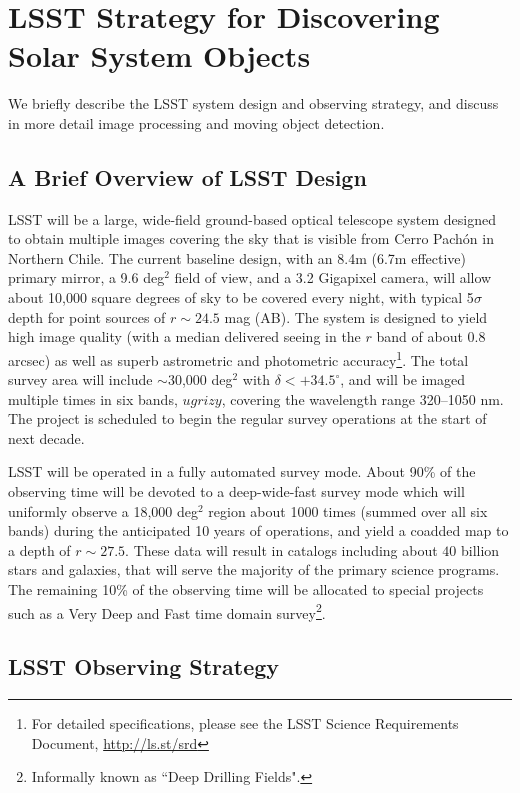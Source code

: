 \section{LSST Strategy for Discovering Solar System Objects}

We briefly describe the LSST system design and observing strategy, and discuss in more
detail image processing and moving object detection.

\subsection{A Brief Overview of LSST  Design}

LSST will be a large, wide-field ground-based optical telescope system
designed to obtain multiple images covering the sky that is visible
from Cerro Pach\'{o}n in Northern Chile. The current baseline design,
with an 8.4m (6.7m effective) primary mirror, a 9.6 deg$^2$ field of
view, and a 3.2 Gigapixel camera, will allow about 10,000 square
degrees of sky to be covered every night, with typical 5$\sigma$ depth
for point sources of $r\sim24.5$ mag (AB). The system is designed to yield
high image quality (with a median delivered seeing in the $r$ band of
about 0.8 arcsec) as well as superb astrometric  and photometric
accuracy\footnote{For detailed specifications, please see the LSST
Science Requirements Document, \url{http://ls.st/srd}}. The total survey
area will include $\sim$30,000 deg$^2$ with $\delta<+34.5^\circ$, and
will be imaged multiple times in six bands, $ugrizy$, covering the
wavelength range 320--1050 nm. The project is scheduled to  begin the
regular survey operations at the start of next decade.

LSST will be operated in a fully automated survey mode. About 90\% of the
observing time will be devoted to a deep-wide-fast survey mode which will
uniformly observe a 18,000 deg$^2$ region about 1000 times (summed over
all six bands) during the anticipated 10 years of operations, and yield a coadded map
to a depth of $r\sim27.5$. These data will result in catalogs including about
$40$ billion stars and galaxies, that will serve the majority of the
primary science programs. The remaining 10\% of the observing time
will be allocated to special projects such as a Very Deep and Fast
time domain survey\footnote{Informally known as ``Deep Drilling Fields".}.



\subsection{LSST Observing Strategy}

